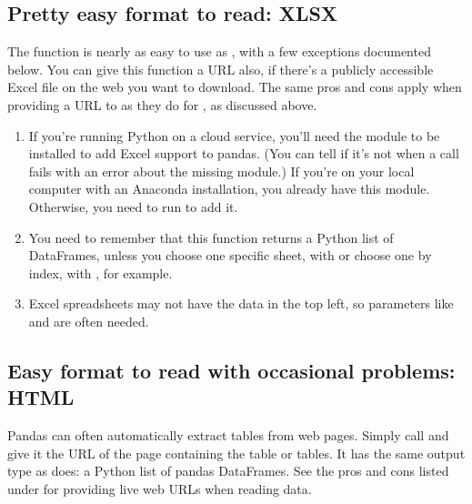 \documentclass[letterpaper,10pt,english]{sphinxmanual}
\begin{document}
\subsection{Pretty easy format to read: XLSX}
\label{\detokenize{chapter-13-etl:pretty-easy-format-to-read-xlsx}}
The  function is nearly as easy to use as , with a few exceptions documented below.  You can give this function a URL also, if there’s a publicly accessible Excel file on the web you want to download.  The same pros and cons apply when providing a URL to  as they do for , as discussed above.
\begin{enumerate}
%
\item {} 
If you’re running Python on a cloud service, you’ll need the  module to be installed to add Excel support to pandas.  (You can tell if it’s not when a  call fails with an error about the missing module.)  If you’re on your local computer with an Anaconda installation, you already have this module.  Otherwise, you need to run  to add it.

\item {} 
You need to remember that this function returns a Python list of DataFrames, unless you choose one specific sheet, with  or choose one by index, with , for example.

\item {} 
Excel spreadsheets may not have the data in the top left, so parameters like  and  are often needed.

\end{enumerate}


\subsection{Easy format to read with occasional problems: HTML}
\label{\detokenize{chapter-13-etl:easy-format-to-read-with-occasional-problems-html}}
Pandas can often automatically extract tables from web pages.  Simply call  and give it the URL of the page containing the table or tables.  It has the same output type as  does: a Python list of pandas DataFrames.  See the pros and cons listed under  for providing live web URLs when reading data.
\end{document}
